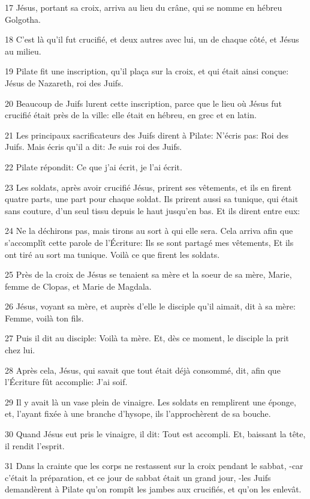 \par 17 Jésus, portant sa croix, arriva au lieu du crâne, qui se nomme en hébreu Golgotha.
\par 18 C'est là qu'il fut crucifié, et deux autres avec lui, un de chaque côté, et Jésus au milieu.
\par 19 Pilate fit une inscription, qu'il plaça sur la croix, et qui était ainsi conçue: Jésus de Nazareth, roi des Juifs.
\par 20 Beaucoup de Juifs lurent cette inscription, parce que le lieu où Jésus fut crucifié était près de la ville: elle était en hébreu, en grec et en latin.
\par 21 Les principaux sacrificateurs des Juifs dirent à Pilate: N'écris pas: Roi des Juifs. Mais écris qu'il a dit: Je suis roi des Juifs.
\par 22 Pilate répondit: Ce que j'ai écrit, je l'ai écrit.
\par 23 Les soldats, après avoir crucifié Jésus, prirent ses vêtements, et ils en firent quatre parts, une part pour chaque soldat. Ils prirent aussi sa tunique, qui était sans couture, d'un seul tissu depuis le haut jusqu'en bas. Et ils dirent entre eux:
\par 24 Ne la déchirons pas, mais tirons au sort à qui elle sera. Cela arriva afin que s'accomplît cette parole de l'Écriture: Ils se sont partagé mes vêtements, Et ils ont tiré au sort ma tunique. Voilà ce que firent les soldats.
\par 25 Près de la croix de Jésus se tenaient sa mère et la soeur de sa mère, Marie, femme de Clopas, et Marie de Magdala.
\par 26 Jésus, voyant sa mère, et auprès d'elle le disciple qu'il aimait, dit à sa mère: Femme, voilà ton fils.
\par 27 Puis il dit au disciple: Voilà ta mère. Et, dès ce moment, le disciple la prit chez lui.
\par 28 Après cela, Jésus, qui savait que tout était déjà consommé, dit, afin que l'Écriture fût accomplie: J'ai soif.
\par 29 Il y avait là un vase plein de vinaigre. Les soldats en remplirent une éponge, et, l'ayant fixée à une branche d'hysope, ils l'approchèrent de sa bouche.
\par 30 Quand Jésus eut pris le vinaigre, il dit: Tout est accompli. Et, baissant la tête, il rendit l'esprit.
\par 31 Dans la crainte que les corps ne restassent sur la croix pendant le sabbat, -car c'était la préparation, et ce jour de sabbat était un grand jour, -les Juifs demandèrent à Pilate qu'on rompît les jambes aux crucifiés, et qu'on les enlevât.

